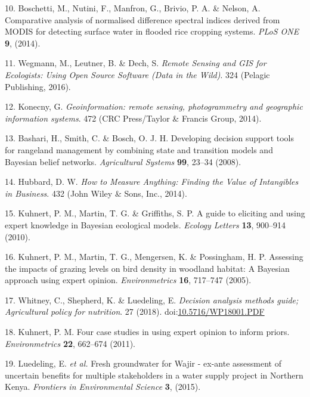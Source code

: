 \documentclass[12pt,oneside]{article}
\begin{document}
\leavevmode\hypertarget{ref-Boschetti_et_al_2014}{}%
10. Boschetti, M., Nutini, F., Manfron, G., Brivio, P. A. \& Nelson, A. Comparative analysis of normalised difference spectral indices derived from MODIS for detecting surface water in flooded rice cropping systems. \emph{PLoS ONE} \textbf{9}, (2014).

\leavevmode\hypertarget{ref-Wegmann_et_al_2016}{}%
11. Wegmann, M., Leutner, B. \& Dech, S. \emph{Remote Sensing and GIS for Ecologists: Using Open Source Software (Data in the Wild)}. 324 (Pelagic Publishing, 2016).

\leavevmode\hypertarget{ref-Konecny_2014}{}%
12. Konecny, G. \emph{Geoinformation: remote sensing, photogrammetry and geographic information systems}. 472 (CRC Press/Taylor \& Francis Group, 2014).

\leavevmode\hypertarget{ref-Bashari_et_al_2008}{}%
13. Bashari, H., Smith, C. \& Bosch, O. J. H. Developing decision support tools for rangeland management by combining state and transition models and Bayesian belief networks. \emph{Agricultural Systems} \textbf{99}, 23--34 (2008).

\leavevmode\hypertarget{ref-Hubbard_2014}{}%
14. Hubbard, D. W. \emph{How to Measure Anything: Finding the Value of Intangibles in Business}. 432 (John Wiley \& Sons, Inc., 2014).

\leavevmode\hypertarget{ref-Kuhnert_et_al_2010}{}%
15. Kuhnert, P. M., Martin, T. G. \& Griffiths, S. P. A guide to eliciting and using expert knowledge in Bayesian ecological models. \emph{Ecology Letters} \textbf{13}, 900--914 (2010).

\leavevmode\hypertarget{ref-Kuhnert_et_al_2005}{}%
16. Kuhnert, P. M., Martin, T. G., Mengersen, K. \& Possingham, H. P. Assessing the impacts of grazing levels on bird density in woodland habitat: A Bayesian approach using expert opinion. \emph{Environmetrics} \textbf{16}, 717--747 (2005).

\leavevmode\hypertarget{ref-Whitney_et_al_2018}{}%
17. Whitney, C., Shepherd, K. \& Luedeling, E. \emph{Decision analysis methods guide; Agricultural policy for nutrition}. 27 (2018). doi:\href{https://doi.org/10.5716/WP18001.PDF}{10.5716/WP18001.PDF}

\leavevmode\hypertarget{ref-Kuhnert_2011}{}%
18. Kuhnert, P. M. Four case studies in using expert opinion to inform priors. \emph{Environmetrics} \textbf{22}, 662--674 (2011).

\leavevmode\hypertarget{ref-Luedeling_et_al_2015}{}%
19. Luedeling, E. \emph{et al.} Fresh groundwater for Wajir - ex-ante assessment of uncertain benefits for multiple stakeholders in a water supply project in Northern Kenya. \emph{Frontiers in Environmental Science} \textbf{3}, (2015).
\end{document}
